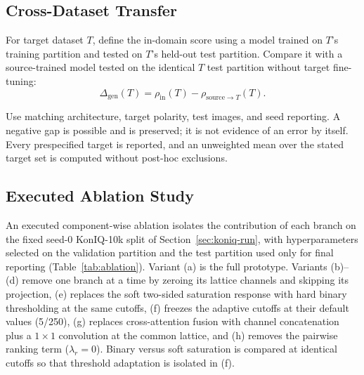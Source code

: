 \documentclass[5p,times,twocolumn]{elsarticle}
\begin{document}
\subsection{Cross-Dataset Transfer}
\label{sec:transfer}

For target dataset $T$, define the in-domain score using a model trained on
$T$'s training partition and tested on $T$'s held-out test partition. Compare
it with a source-trained model tested on the identical $T$ test partition
without target fine-tuning:
\begin{equation}
\Delta_{\mathrm{gen}}(T) = \rho_{\mathrm{in}}(T)
- \rho_{\mathrm{source} \to T}(T).
\label{eq:dgen}
\end{equation}

Use matching architecture, target polarity, test images, and seed reporting. A
negative gap is possible and is preserved; it is not evidence of an error by
itself. Every prespecified target is reported, and an unweighted mean over the
stated target set is computed without post-hoc exclusions.

\subsection{Executed Ablation Study}
\label{sec:ablation}

An executed component-wise ablation isolates the contribution of each branch
on the fixed seed-0 KonIQ-10k split of Section~\ref{sec:koniq-run}, with
hyperparameters selected on the validation partition and the test partition
used only for final reporting
(Table~\ref{tab:ablation}). Variant (a) is the full prototype. Variants
(b)--(d) remove one branch at a time by zeroing its lattice channels and
skipping its projection, (e) replaces the soft two-sided saturation response
with hard binary thresholding at the same cutoffs, (f) freezes the adaptive
cutoffs at their default values (5/250), (g) replaces cross-attention fusion
with channel concatenation plus a $1{\times}1$ convolution at the common
lattice, and (h) removes the pairwise ranking term ($\lambda_r = 0$). Binary
versus soft saturation is compared at identical cutoffs so that threshold
adaptation is isolated in (f).
\end{document}
